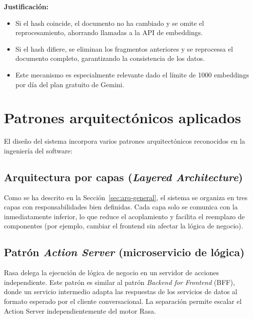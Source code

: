 \textbf{Justificación:}
\begin{itemize}
    \item Si el hash coincide, el documento no ha cambiado y se omite el reprocesamiento, ahorrando llamadas a la API de embeddings.
    \item Si el hash difiere, se eliminan los fragmentos anteriores y se reprocessa el documento completo, garantizando la consistencia de los datos.
    \item Este mecanismo es especialmente relevante dado el límite de 1000 embeddings por día del plan gratuito de Gemini.
\end{itemize}


\section{Patrones arquitectónicos aplicados}\label{sec:patrones}

El diseño del sistema incorpora varios patrones arquitectónicos reconocidos en la ingeniería del software:

\subsection{Arquitectura por capas (\textit{Layered Architecture})}

Como se ha descrito en la Sección~\ref{sec:arq-general}, el sistema se organiza en tres capas con responsabilidades bien definidas. Cada capa solo se comunica con la inmediatamente inferior, lo que reduce el acoplamiento y facilita el reemplazo de componentes (por ejemplo, cambiar el frontend sin afectar la lógica de negocio).

\subsection{Patrón \textit{Action Server} (microservicio de lógica)}

Rasa delega la ejecución de lógica de negocio en un servidor de acciones independiente. Este patrón es similar al patrón \textit{Backend for Frontend} (BFF), donde un servicio intermedio adapta las respuestas de los servicios de datos al formato esperado por el cliente conversacional. La separación permite escalar el Action Server independientemente del motor Rasa.


